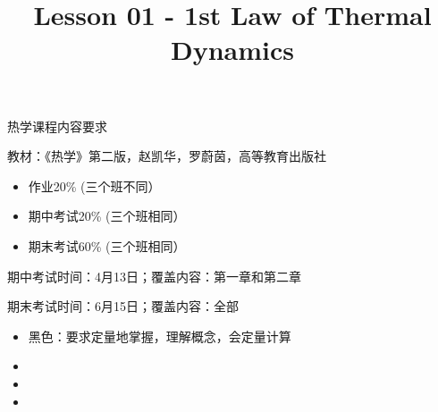 \documentclass[CJK]{beamer}
\title{Lesson 01 - 1st Law of Thermal Dynamics}
\author{}
\date{}
\begin{document}
\begin{frame}
\begin{center}
\begin{Large}
\bch
热学课程内容要求

\ech
\end{Large}
\end{center}

\vskip 0.2in

\bch
教材：《热学》第二版，赵凯华，罗蔚茵，高等教育出版社
\ech

\end{frame}


\begin{frame}
\bch

\begin{itemize}
\item{作业20\% (三个班不同）}
\item{期中考试20\% (三个班相同）}
\item{期末考试60\% (三个班相同）}
\end{itemize}

\skipline

期中考试时间：4月13日；覆盖内容：第一章和第二章

期末考试时间：6月15日；覆盖内容：全部
\ech
\end{frame}

\begin{frame}
\bch

\begin{itemize}
\item{黑色：要求定量地掌握，理解概念，会定量计算}
\item{}
\item{}
\item{}
\end{itemize}

\ech
\end{frame}
\end{document}

